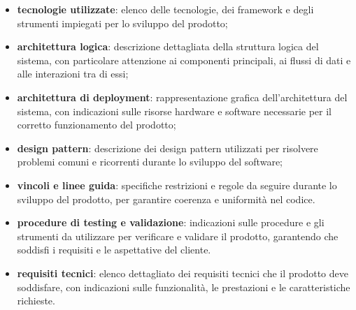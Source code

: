 \begin{itemize}
	\item \textbf{tecnologie utilizzate}: elenco delle tecnologie, dei framework e degli strumenti impiegati per lo sviluppo del prodotto;
	\item \textbf{architettura logica}: descrizione dettagliata della struttura logica del sistema, con particolare attenzione ai componenti principali, ai flussi di dati e alle interazioni tra di essi;
	\item \textbf{architettura di deployment}: rappresentazione grafica dell'architettura del sistema, con indicazioni sulle risorse hardware e software necessarie per il corretto funzionamento del prodotto;
	\item \textbf{design pattern}: descrizione dei design pattern utilizzati per risolvere problemi comuni e ricorrenti durante lo sviluppo del software;
	\item \textbf{vincoli e linee guida}: specifiche restrizioni e regole da seguire durante lo sviluppo del prodotto, per garantire coerenza e uniformità nel codice.
	\item \textbf{procedure di testing e validazione}: indicazioni sulle procedure e gli strumenti da utilizzare per verificare e validare il prodotto, garantendo che soddisfi i requisiti e le aspettative del cliente.
	\item \textbf{requisiti tecnici}: elenco dettagliato dei requisiti tecnici che il prodotto deve soddisfare, con indicazioni sulle funzionalità, le prestazioni e le caratteristiche richieste.
\end{itemize}

